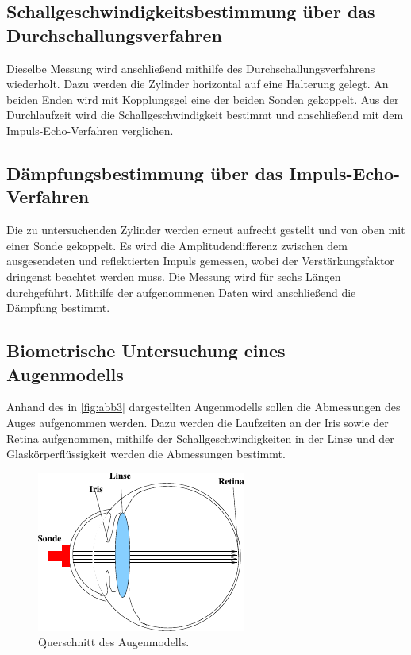 \subsection{Schallgeschwindigkeitsbestimmung über das Durchschallungsverfahren}

Dieselbe Messung wird anschließend mithilfe des Durchschallungsverfahrens wiederholt.
Dazu werden die Zylinder horizontal auf eine Halterung gelegt. An beiden Enden wird mit Kopplungsgel eine der beiden Sonden gekoppelt. %
Aus der Durchlaufzeit wird die Schallgeschwindigkeit bestimmt und anschließend mit dem Impuls-Echo-Verfahren verglichen. \\


\subsection{Dämpfungsbestimmung über das Impuls-Echo-Verfahren}

Die zu untersuchenden Zylinder werden erneut aufrecht gestellt und von oben mit einer Sonde gekoppelt.
Es wird die Amplitudendifferenz zwischen dem ausgesendeten und reflektierten Impuls gemessen, wobei der Verstärkungsfaktor dringenst beachtet werden muss.%
Die Messung wird für sechs Längen durchgeführt. Mithilfe der aufgenommenen Daten wird anschließend die Dämpfung bestimmt.%


\subsection{Biometrische Untersuchung eines Augenmodells}

Anhand des in \autoref{fig:abb3} dargestellten Augenmodells sollen die Abmessungen des Auges aufgenommen werden.
Dazu werden die Laufzeiten an der Iris sowie der Retina aufgenommen, mithilfe der Schallgeschwindigkeiten in der Linse und der Glaskörperflüssigkeit werden die Abmessungen bestimmt.
\begin{figure}
    \centering
    \includegraphics{figures/abb3.pdf} 
    \caption{Querschnitt des Augenmodells\cite{ap06}.}
    \label{fig:abb3}
\end{figure}






